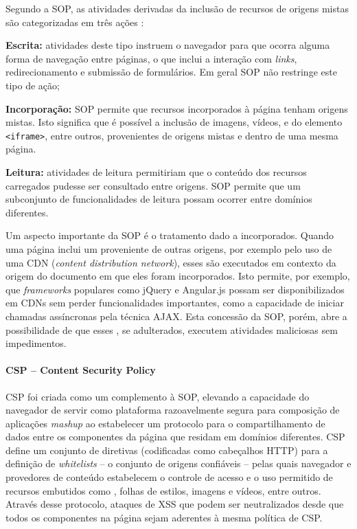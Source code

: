 Segundo a SOP, as atividades derivadas da inclusão de recursos de origens mistas são categorizadas em três ações \cite{Ruderman2017}:

\begin{alineas}
	\item \textbf{Escrita:} atividades deste tipo instruem o navegador para que ocorra alguma forma de navegação entre páginas, o que inclui a interação com \textit{links}, redirecionamento e submissão de formulários. Em geral SOP não restringe este tipo de ação;
	\item \textbf{Incorporação:} SOP permite que recursos incorporados à página tenham origens mistas. Isto significa que é possível a inclusão de imagens, vídeos, {\scripts} e do elemento \texttt{<iframe>}, entre outros, provenientes de origens mistas e dentro de uma mesma página.
	\item \textbf{Leitura:} atividades de leitura permitiriam que o conteúdo dos recursos carregados pudesse ser consultado entre origens. SOP permite que um subconjunto de funcionalidades de leitura possam ocorrer entre domínios diferentes.
\end{alineas}

Um aspecto importante da SOP é o tratamento dado a {\scripts} incorporados. Quando uma página inclui um {\script} proveniente de outras origens, por exemplo pelo uso de uma CDN (\textit{content distribution network}), esses {\scripts} são executados em contexto da origem do documento em que eles foram incorporados. Isto permite, por exemplo, que \textit{frameworks} populares como jQuery e Angular.js possam ser disponibilizados em CDNs sem perder funcionalidades importantes, como a capacidade de iniciar chamadas assíncronas pela técnica AJAX. Esta concessão da SOP, porém, abre a possibilidade de que esses {\scripts}, se adulterados, executem atividades maliciosas sem impedimentos.

\paragraph{CSP -- Content Security Policy}
CSP foi criada como um complemento à SOP, elevando a capacidade do navegador de servir como plataforma razoavelmente segura para composição de aplicações \textit{mashup} ao estabelecer um protocolo para o compartilhamento de dados entre os componentes da página que residam em domínios diferentes. CSP define um conjunto de diretivas (codificadas como cabeçalhos HTTP) para a definição de \textit{whitelists} -- o conjunto de origens confiáveis -- pelas quais navegador e provedores de conteúdo estabelecem o controle de acesso e o uso permitido de recursos embutidos como {\scripts}, folhas de estilos, imagens e vídeos, entre outros. Através desse protocolo, ataques de XSS que podem ser neutralizados desde que todos os componentes na página sejam aderentes à mesma política de CSP.


